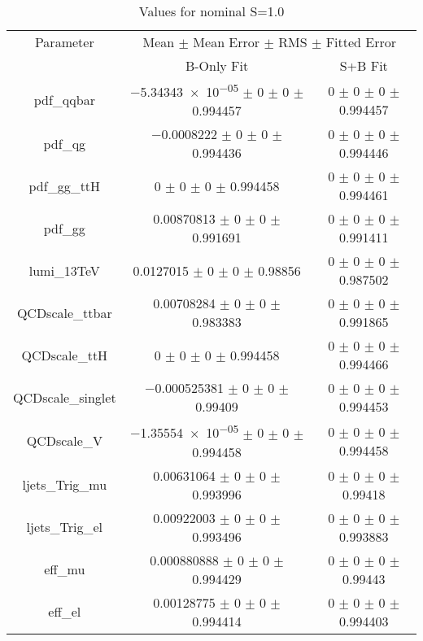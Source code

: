 \begin{table}
\centering
\caption{Values for nominal S=1.0}
\begin{tabular}{ccc}
\toprule
Parameter & \multicolumn{2}{c}{Mean $\pm$ Mean Error $\pm$ RMS $\pm$ Fitted Error}\\
 & B-Only Fit & S+B Fit\\
\midrule
pdf\_qqbar & \num{-5.34343e-05} $\pm$ \num{0} $\pm$ \num{0} $\pm$ \num{0.994457} & \num{0} $\pm$ \num{0} $\pm$ \num{0} $\pm$ \num{0.994457}\\
pdf\_qg & \num{-0.0008222} $\pm$ \num{0} $\pm$ \num{0} $\pm$ \num{0.994436} & \num{0} $\pm$ \num{0} $\pm$ \num{0} $\pm$ \num{0.994446}\\
pdf\_gg\_ttH & \num{0} $\pm$ \num{0} $\pm$ \num{0} $\pm$ \num{0.994458} & \num{0} $\pm$ \num{0} $\pm$ \num{0} $\pm$ \num{0.994461}\\
pdf\_gg & \num{0.00870813} $\pm$ \num{0} $\pm$ \num{0} $\pm$ \num{0.991691} & \num{0} $\pm$ \num{0} $\pm$ \num{0} $\pm$ \num{0.991411}\\
lumi\_13TeV & \num{0.0127015} $\pm$ \num{0} $\pm$ \num{0} $\pm$ \num{0.98856} & \num{0} $\pm$ \num{0} $\pm$ \num{0} $\pm$ \num{0.987502}\\
QCDscale\_ttbar & \num{0.00708284} $\pm$ \num{0} $\pm$ \num{0} $\pm$ \num{0.983383} & \num{0} $\pm$ \num{0} $\pm$ \num{0} $\pm$ \num{0.991865}\\
QCDscale\_ttH & \num{0} $\pm$ \num{0} $\pm$ \num{0} $\pm$ \num{0.994458} & \num{0} $\pm$ \num{0} $\pm$ \num{0} $\pm$ \num{0.994466}\\
QCDscale\_singlet & \num{-0.000525381} $\pm$ \num{0} $\pm$ \num{0} $\pm$ \num{0.99409} & \num{0} $\pm$ \num{0} $\pm$ \num{0} $\pm$ \num{0.994453}\\
QCDscale\_V & \num{-1.35554e-05} $\pm$ \num{0} $\pm$ \num{0} $\pm$ \num{0.994458} & \num{0} $\pm$ \num{0} $\pm$ \num{0} $\pm$ \num{0.994458}\\
ljets\_Trig\_mu & \num{0.00631064} $\pm$ \num{0} $\pm$ \num{0} $\pm$ \num{0.993996} & \num{0} $\pm$ \num{0} $\pm$ \num{0} $\pm$ \num{0.99418}\\
ljets\_Trig\_el & \num{0.00922003} $\pm$ \num{0} $\pm$ \num{0} $\pm$ \num{0.993496} & \num{0} $\pm$ \num{0} $\pm$ \num{0} $\pm$ \num{0.993883}\\
eff\_mu & \num{0.000880888} $\pm$ \num{0} $\pm$ \num{0} $\pm$ \num{0.994429} & \num{0} $\pm$ \num{0} $\pm$ \num{0} $\pm$ \num{0.99443}\\
eff\_el & \num{0.00128775} $\pm$ \num{0} $\pm$ \num{0} $\pm$ \num{0.994414} & \num{0} $\pm$ \num{0} $\pm$ \num{0} $\pm$ \num{0.994403}\\

\end{tabular}
\end{table}
